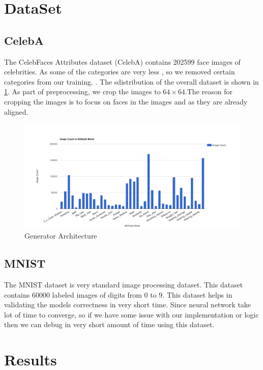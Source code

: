 \section{DataSet}
\subsection{CelebA}
The CelebFaces Attributes dataset (CelebA)\cite{celeba} contains 202599 face images of celebrities. As some of the categories are very less , so we removed certain categories from our training. . The sdistribution of the overall dataset is shown in \cref{fig:celeba}. As part of preprocessing, we crop the images to $64 \times 64$.The reason for cropping the images is to focus on faces in the images and as they are already aligned.


\begin{figure}[H]
  \centering
    \includegraphics[scale=.3, angle=0]{Files/celeba-visualize.png}
    \caption[Generator Architecture]{Generator Architecture\cite{DCGAN}}
    \label{fig:celeba}
\end{figure}

\subsection{MNIST}
The MNIST dataset is very standard image processing dataset. This dataset contains 60000 labeled images of digits from 0 to 9. This dataset helps in validating the models correctness in very short time. Since neural  network take lot of time to converge, so if we have some issue with our implementation or logic then we can debug in very short amount of time using this dataset.

\section{Results}

